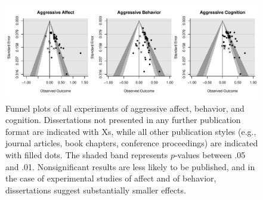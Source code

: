 \documentclass[man, mask]{apa6}
\begin{document}
\begin{figure}
	\includegraphics[width = \textwidth, keepaspectratio]{funnel_diss.pdf}
	\caption{Funnel plots of all experiments of aggressive affect, behavior, and cognition. Dissertations not presented in any further publication format are indicated with Xs, while all other publication styles (e.g., journal articles, book chapters, conference proceedings) are indicated with filled dots. The shaded band represents $p$-values between .05 and .01. Nonsignificant results are less likely to be published, and in the case of experimental studies of affect and of behavior, dissertations suggest substantially smaller effects.}
	\label{funnel-diss}
\end{figure}
\end{document}
